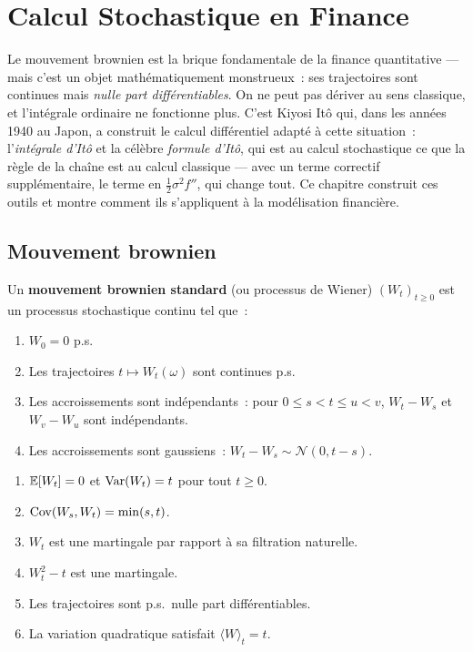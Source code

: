 \chapter{Calcul Stochastique en Finance}
\label{ch:calcul_stochastique}

Le mouvement brownien est la brique fondamentale de la finance quantitative --- mais c'est un objet math\'ematiquement monstrueux~: ses trajectoires sont continues mais \emph{nulle part diff\'erentiables}. On ne peut pas d\'eriver au sens classique, et l'int\'egrale ordinaire ne fonctionne plus. C'est Kiyosi It\^o qui, dans les ann\'ees 1940 au Japon, a construit le calcul diff\'erentiel adapt\'e \`a cette situation~: l'\emph{int\'egrale d'It\^o} et la c\'el\`ebre \emph{formule d'It\^o}, qui est au calcul stochastique ce que la r\`egle de la cha\^ine est au calcul classique --- avec un terme correctif suppl\'ementaire, le terme en $\frac{1}{2}\sigma^2 f''$, qui change tout. Ce chapitre construit ces outils et montre comment ils s'appliquent \`a la mod\'elisation financi\`ere.

\section{Mouvement brownien}

\begin{definition}
Un \textbf{mouvement brownien standard} (ou processus de Wiener)
$(W_t)_{t \geq 0}$ est un processus stochastique continu tel que~:
\begin{enumerate}
    \item $W_0 = 0$ p.s.
    \item Les trajectoires $t \mapsto W_t(\omega)$ sont continues p.s.
    \item Les accroissements sont ind\'ependants~: pour $0 \leq s < t \leq u < v$,
          $W_t - W_s$ et $W_v - W_u$ sont ind\'ependants.
    \item Les accroissements sont gaussiens~: $W_t - W_s \sim \mathcal{N}(0, t-s)$.
\end{enumerate}
\end{definition}

\begin{proposition}
\begin{enumerate}
    \item $\mathbb{E}[W_t] = 0$ et $\mathrm{Var}(W_t) = t$ pour tout $t \geq 0$.
    \item $\mathrm{Cov}(W_s, W_t) = \min(s,t)$.
    \item $W_t$ est une martingale par rapport \`a sa filtration naturelle.
    \item $W_t^2 - t$ est une martingale.
    \item Les trajectoires sont p.s.\ nulle part diff\'erentiables.
    \item La variation quadratique satisfait $\langle W \rangle_t = t$.
\end{enumerate}
\end{proposition}

